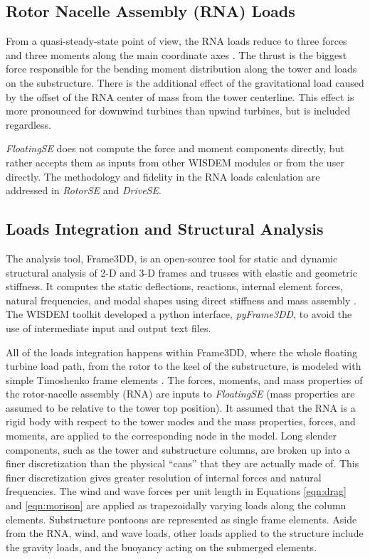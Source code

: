 \subsection{Rotor Nacelle Assembly (RNA) Loads}
From a quasi-steady-state point of view, the RNA loads reduce to three
forces and three moments along the main coordinate axes
\citet{JacketSE}. The thrust is the biggest force responsible for the
bending moment distribution along the tower and loads on the
substructure.  There is the additional effect of the gravitational load
caused by the offset of the RNA center of mass from the tower
centerline.  This effect is more pronounced for downwind turbines than
upwind turbines, but is included regardless.

\textit{FloatingSE} does not compute the force and moment components
directly, but rather accepts them as inputs from other WISDEM modules or
from the user directly.  The methodology and fidelity in the RNA loads
calculation are addressed in \textit{RotorSE} and \textit{DriveSE}.


\subsection{Loads Integration and Structural Analysis}
The analysis tool, Frame3DD, is an open-source tool for static and
dynamic structural analysis of 2-D and 3-D frames and trusses with
elastic and geometric stiffness. It computes the static deflections,
reactions, internal element forces, natural frequencies, and modal
shapes using direct stiffness and mass assembly \citep{frame3dd}.  The
WISDEM toolkit developed a python interface, \textit{pyFrame3DD}, to avoid the
use of intermediate input and output text files.

All of the loads integration happens within Frame3DD, where the whole
floating turbine load path, from the rotor to the keel of the
substructure, is modeled with simple Timoshenko frame elements
\citep{timoshenko}.  The forces, moments, and mass properties of the
rotor-nacelle assembly (RNA) are inputs to \textit{FloatingSE} (mass
properties are assumed to be relative to the tower top position).  It
assumed that the RNA is a rigid body with respect to the tower modes and
the mass properties, forces, and moments, are applied to the
corresponding node in the model.  Long slender components, such as the
tower and substructure columns, are broken up into a finer
discretization than the physical ``cans'' that they are actually made
of.  This finer discretization gives greater resolution of internal
forces and natural frequencies.  The wind and wave forces per unit
length in Equations \ref{eqn:drag} and \ref{eqn:morison} are applied as
trapezoidally varying loads along the column elements.  Substructure
pontoons are represented as single frame elements.  Aside from the RNA,
wind, and wave loads, other loads applied to the structure include the
gravity loads, and the buoyancy acting on the submerged elements.

